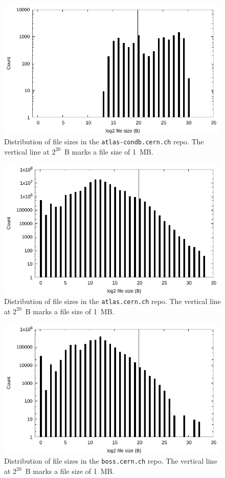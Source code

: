 \documentclass[sigconf]{acmart}
\begin{document}
\begin{figure}
\includegraphics[width=\linewidth]{plots/file-hist/atlas-condb.pdf}
\caption{Distribution of file sizes in the \texttt{atlas-condb.cern.ch} repo.
The vertical line at $2^{20}$~B marks a file size of 1~MB.}
\end{figure}

\begin{figure}
\includegraphics[width=\linewidth]{plots/file-hist/atlas.pdf}
\caption{Distribution of file sizes in the \texttt{atlas.cern.ch} repo.
The vertical line at $2^{20}$~B marks a file size of 1~MB.}
\end{figure}

\begin{figure}
\includegraphics[width=\linewidth]{plots/file-hist/boss.pdf}
\caption{Distribution of file sizes in the \texttt{boss.cern.ch} repo.
The vertical line at $2^{20}$~B marks a file size of 1~MB.}
\end{figure}
\end{document}
